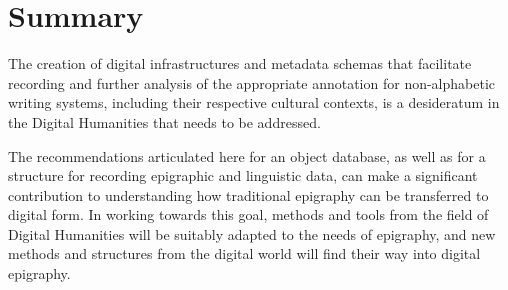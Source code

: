 \documentclass[amsthm,ebook]{saparticle}
\begin{document}
\newpage
\section[Summary ]{Summary}
\noindent The creation of digital infrastructures and metadata schemas that facilitate recording and further analysis of the
appropriate annotation for non-alphabetic writing systems, including their respective cultural contexts, is a
desideratum in the Digital Humanities that needs to be addressed.

The recommendations articulated here for an object database, as well as for a structure for recording epigraphic and
linguistic data, can make a significant contribution to understanding how traditional epigraphy can be transferred to
digital form. In working towards this goal, methods and tools from the field of Digital Humanities will be suitably
adapted to the needs of epigraphy, and new methods and structures from the digital world will find their way into
digital epigraphy. 

\nocite{Gronemeyer2014}



\end{document}
